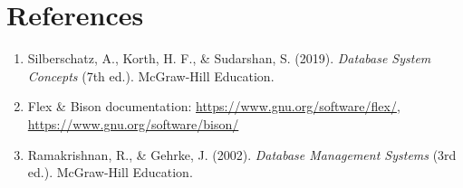 \documentclass[12pt,a4paper]{article}
\begin{document}
\section{References}
\begin{enumerate}
    \item Silberschatz, A., Korth, H. F., \& Sudarshan, S. (2019). \textit{Database System Concepts} (7th ed.). McGraw-Hill Education.
    \item Flex \& Bison documentation: \url{https://www.gnu.org/software/flex/}, \url{https://www.gnu.org/software/bison/}
    \item Ramakrishnan, R., \& Gehrke, J. (2002). \textit{Database Management Systems} (3rd ed.). McGraw-Hill Education.
\end{enumerate}
\end{document}
